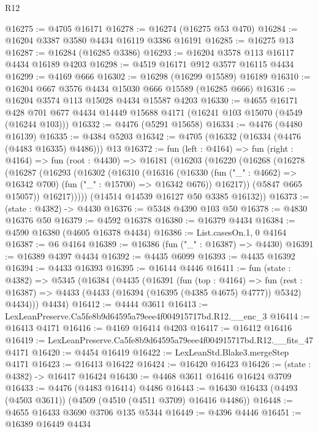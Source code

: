 \begin{lexlean}{R12}
\begin{coremodule}
@16275 := @4705 @16171
@16278 := @16274 (@16275 @53 @470)
@16284 := @16204 @3387 @3580 @4434 @16119 @3386 @16191
@16285 := @16275 @13
@16287 := @16284 (@16285 @3386)
@16293 := @16204 @3578 @113 @16117 @4434 @16189 @4203
@16298 := @4519 @16171 @912 @3577 @16115 @4434
@16299 := @4169 @666
@16302 := @16298 (@16299 @15589) @16189
@16310 := @16204 @667 @3576 @4434 @15030 @666 @15589 (@16285 @666)
@16316 := @16204 @3574 @113 @15028 @4434 @15587 @4203
@16330 := @4655
    @16171
    @428
    @701
    @677
    @4434
    @14449
    @15688
    @4171
    (@16241 @103 @15070 (@4549 (@16244 @103)))
@16332 := @4476 (@5291 @15658)
@16334 := @4476 (@4480 @16139)
@16335 := @4384 @5203
@16342 := @4705 (@16332 (@16334 (@4476 (@4483 @16335) @4486))) @13
@16372 := fun (left : @4164) =>
  fun (right : @4164) =>
  fun (root : @4430) =>
  @16181
    (@16203
      (@16220
        (@16268
          (@16278
            (@16287
              (@16293
                (@16302
                  (@16310
                    (@16316
                      (@16330
                        (fun ("_" : @4662) => @16342 @700)
                        (fun ("_" : @15700) => @16342 @676))
                      @16217))
                  (@5847 @665 @15057))
                @16217)))))
      (@14514 @14539 @16127 @50 @3385 @16132))
@16373 := (state : @4382) -> @4430
@16376 := @5348 @4390 @103 @50
@16378 := @4830 @16376 @50
@16379 := @4592 @16378
@16380 := @16379 @4434
@16384 := @4590 @16380 (@4605 @16378 @4434)
@16386 := List.casesOn.{1, 0} @4164
@16387 := @6 @4164
@16389 := @16386 (fun ("_" : @16387) => @4430)
@16391 := @16389 @4397 @4434
@16392 := @4435 @6099
@16393 := @4435 @16392
@16394 := @4433 @16393
@16395 := @16144 @4446
@16411 := fun (state : @4382) =>
  @5345
    (@16384
      (@4435
        (@16391
          (fun (top : @4164) =>
          fun (rest : @16387) => @4433 (@4433 (@16394 (@16395 (@4385 @4675) @4777)) @5342) @4434)))
      @4434)
@16412 := @4444 @3611
@16413 := LexLeanPreserve.Ca5fe8b9d64595a79eee4f004915717bd.R12.__enc_3
@16414 := @16413 @4171
@16416 := @4169 @16414 @4203
@16417 := @16412 @16416
@16419 := LexLeanPreserve.Ca5fe8b9d64595a79eee4f004915717bd.R12.__fits_47 @4171
@16420 := @4454 @16419
@16422 := LexLeanStd.Blake3.mergeStep @4171
@16423 := @16413 @16422
@16424 := @16420 @16423
@16426 := (state : @4382) -> @16417 @16424
@16430 := @4468 @3611 @16416 @16424 @3709
@16433 := @4476 (@4483 @16414) @4486
@16443 := @16430 @16433 (@4493 (@4503 @3611)) (@4509 (@4510 (@4511 @3709) @16416 @4486))
@16448 := @4655 @16433 @3690 @3706 @135 @5344
@16449 := @4396 @4446
@16451 := @16389 @16449 @4434

\end{coremodule}
\end{lexlean}
